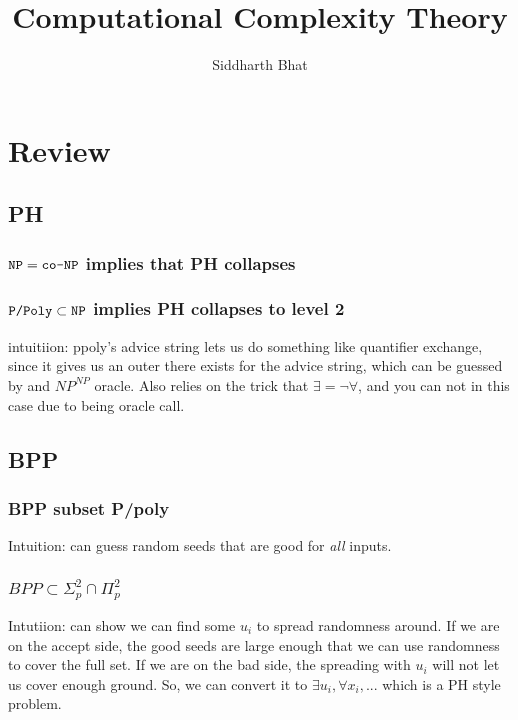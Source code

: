 \documentclass[11pt]{book}
\title{Computational Complexity Theory}
\author{Siddharth Bhat}
\date{}
\begin{document}
\maketitle
\tableofcontents














\chapter{Review}
\section{PH}
\subsection{$\texttt{NP} = \texttt{co-NP}$ implies that PH collapses}
\subsection{$\text{\texttt{P/Poly}} \subset \texttt{NP}$ implies PH collapses to level 2}
intuitiion: ppoly's advice string lets us do something like quantifier
exchange, since it gives us an outer there exists for the advice string,
which can be guessed by and $NP^{NP}$ oracle. Also relies on the trick that
$\exists = \lnot \forall$, and you can not in this case due to being oracle call.
\section{BPP}
\subsection{BPP subset P/poly}
Intuition: can guess random seeds that are good for \emph{all} inputs.
\subsection{$BPP \subset \Sigma_p^2 \cap \Pi_p^2$}
Intutiion: can show we can find some $u_i$ to spread randomness around.
If we are on the accept side, the good seeds are large enough that we
can use randomness to cover the full set. If we are on the bad side, the
spreading with $u_i$ will not let us cover enough ground. So, we can 
convert it to $\exists u_i, \forall x_i, ...$ which is a PH style problem.
\end{document}
